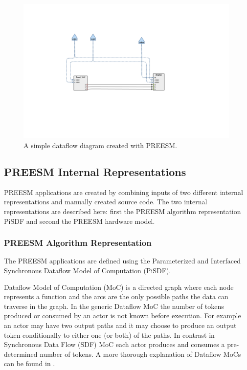 \begin{figure}[h!]
    \begin{center}
        \includegraphics[width=0.99\textwidth]{images/example_preesm_diagram.png}
        \caption{A simple dataflow diagram created with PREESM.}
        \label{fig:preesm_example}
    \end{center}
\end{figure}

\subsection{PREESM Internal Representations}
\label{sec:dataflow}
PREESM applications are created by combining inputs of two different internal representations and manually created source code. The two internal representations are described here: first the PREESM algorithm representation PiSDF and second the PREESM hardware model.

\subsubsection{PREESM Algorithm Representation}
The PREESM applications are defined using the Parameterized and Interfaced Synchronous Dataflow Model of Computation (PiSDF)\cite{pelcat2014preesm}. 

Dataflow Model of Computation (MoC) is a directed graph where each node represents a function and the arcs are the only possible paths the data can traverse in the graph. In the generic Dataflow MoC the number of tokens produced or consumed by an actor is not known before execution. For example an actor may have two output paths and it may choose to produce an output token conditionally to either one (or both) of the paths. In contrast in Synchronous Data Flow (SDF) MoC each actor produces and consumes a pre-determined number of tokens. \cite{lee1987synchronous} A more thorough explanation of Dataflow MoCs can be found in \cite{lee2015introduction}.

